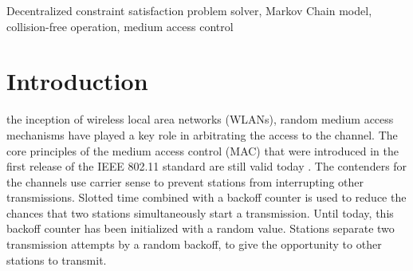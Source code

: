 \documentclass[journal]{IEEEtran}
\begin{document}
\begin{IEEEkeywords}
Decentralized constraint satisfaction problem solver, Markov Chain model, collision-free operation, medium access control
\end{IEEEkeywords}






%
\IEEEpeerreviewmaketitle



\section{Introduction}
%
%
%
%



 the inception of wireless local area networks (WLANs), random medium access mechanisms have played a key role in arbitrating the access to the channel. The core principles of the medium access control (MAC) that were introduced in the first release of the IEEE 802.11 standard are still valid today \cite{IEEE80211-IEEESTD2007}. The contenders for the channels use carrier sense to prevent stations from interrupting other transmissions. Slotted time combined with a backoff counter is used to reduce the chances that two stations simultaneously start a transmission. Until today, this backoff counter has been initialized with a random value. Stations separate two transmission attempts by a random backoff, to give the opportunity to other stations to transmit.
\end{document}
